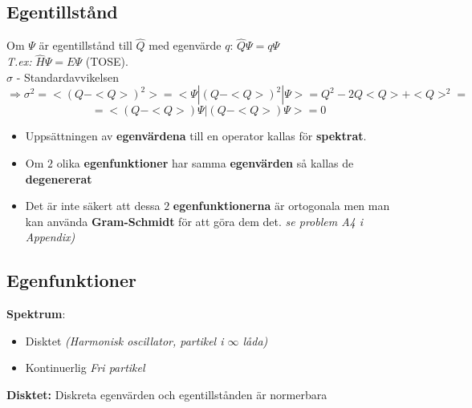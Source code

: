 \documentclass{article}
\begin{document}
  \subsection*{Egentillstånd}
    Om $\Psi$ är egentillstånd till $\hat{Q}$ med egenvärde $q$: $\hat{Q}\Psi=q\Psi$\\
    \textit{T.ex:} $\hat{H}\Psi=E\Psi$ (TOSE).\\

    $\sigma$ - Standardavvikelsen
    \[
      \Rightarrow \sigma^2=<(Q-<Q>)^2>=<\Psi|(Q-<Q>)^2|\Psi>=Q^2-2Q<Q>+<Q>^2=
    \]
    \[
      =<(Q-<Q>)\Psi|(Q-<Q>)\Psi>=0
    \]
    \begin{itemize}
      \item Uppsättningen av \textbf{egenvärdena} till en operator kallas för \textbf{spektrat}.
      \item Om $2$ olika \textbf{egenfunktioner} har samma \textbf{egenvärden} så kallas de \textbf{degenererat}
      \item Det är inte säkert att dessa $2$ \textbf{egenfunktionerna} är ortogonala men man kan använda \textbf{Gram-Schmidt} för att göra dem det. \textit{se problem A4 i Appendix)}
    \end{itemize}

  \subsection*{Egenfunktioner}
    \textbf{Spektrum}:
    \begin{itemize}
      \item Disktet \textit{(Harmonisk oscillator, partikel i $\infty$ låda)}
      \item Kontinuerlig \textit{Fri partikel}
    \end{itemize}
    \textbf{Disktet:} Diskreta egenvärden och egentillstånden är normerbara\\
\end{document}
